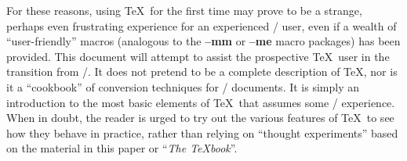 For these reasons, using \TeX\ for the first time
may prove to be a strange,
perhaps even frustrating experience for an experienced \Troff/
user, even if a wealth of ``user-friendly'' macros (analogous
to the {\bf --mm} or {\bf --me} macro packages) has been
provided.  This document will attempt to assist the prospective
\TeX\ user in the transition from \Troff/.  It does not pretend
to be a complete description of \TeX, nor is it a ``cookbook''
of conversion techniques for \Troff/ documents.  It is simply
an introduction to the most basic elements of \TeX\ that
assumes some \Troff/ experience.  When in doubt,
the reader is urged to try
out the various features of \TeX\ to see how they behave in
practice, rather than relying on ``thought experiments''
based on the material in this paper or ``{\sl The \TeX book}''.












\PrintTOC

\bye
